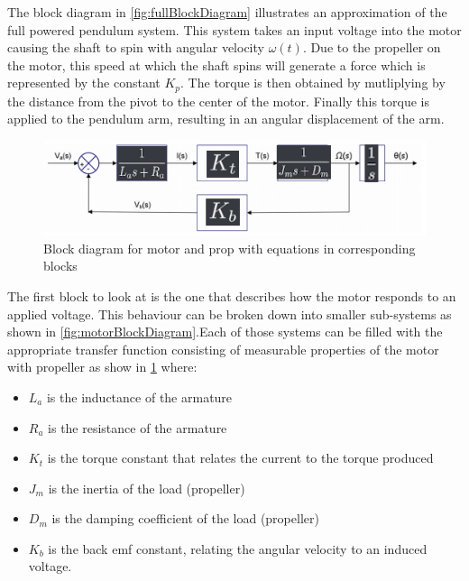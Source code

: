 \documentclass[a4paper, 11pt, compsoc]{IEEEtran}
\begin{document}
        The block diagram in \cref{fig:fullBlockDiagram} illustrates an approximation of the full powered pendulum system. This system takes an input voltage into the motor causing the shaft to spin with angular velocity $\omega(t)$. Due to the propeller on the motor, this speed at which the shaft spins will generate a force which is represented by the constant $K_p$. The torque is then obtained by mutliplying by the distance from the pivot to the center of the motor. Finally this torque is applied to the pendulum arm, resulting in an angular displacement of the arm.
        \par

        \begin{figure}[]
            \centering
            \includegraphics[width=\columnwidth]{full.png}
            \caption{Block diagram for motor and prop with equations in corresponding blocks \cite{gouws_2008}}
            \label{fig:motorBlockDiagramValues}
        \end{figure}
        The first block to look at is the one that describes how the motor responds to an applied voltage. This behaviour can be broken down into smaller sub-systems as shown in \cref{fig:motorBlockDiagram}.Each of those systems can be filled with the appropriate transfer function consisting of measurable properties of the motor with propeller as show in \cref{fig:motorBlockDiagramValues} where:
        \begin{itemize}
            \item $L_a$ is the inductance of the armature
            \item $R_a$ is the resistance of the armature
            \item $K_t$ is the torque constant that relates the current to the torque produced
            \item $J_m$ is the inertia of the load (propeller)
            \item $D_m$ is the damping coefficient of the load (propeller)
            \item $K_b$ is the back emf constant, relating the angular velocity to an induced voltage.
        \end{itemize}
        
\end{document}

